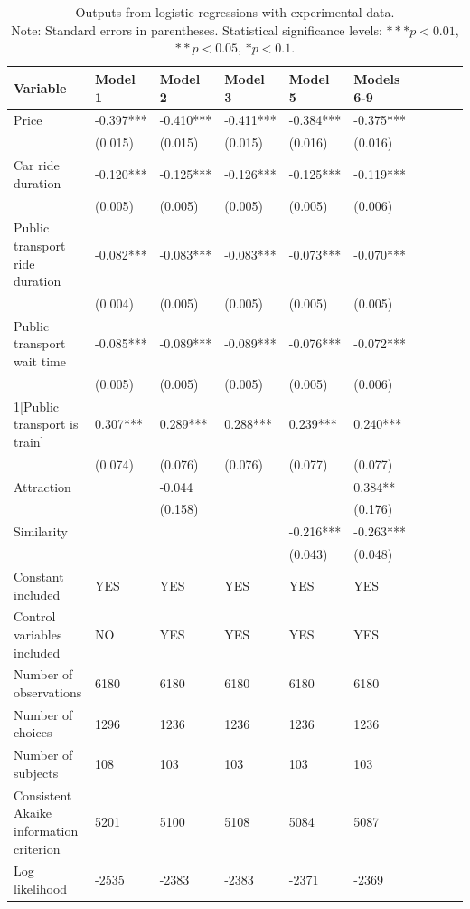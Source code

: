 \documentclass[a4paper,12pt]{article}
\begin{document}
\section{}\label{appendix:nejcDataRobustnessChecks}
\clearpage
\begin{table}
    \centering
    \scriptsize
    \begin{tabular}{p{5.3cm}*{9}{p{1.5cm}}}
    \toprule
    Variable & Model 1 & Model 2 & Model 3 & Model 5 & Models 6-9 \\
    \midrule
    Price & -0.397*** & -0.410*** & -0.411*** & -0.384*** & -0.375*** \\
     & (0.015) & (0.015) & (0.015) & (0.016) & (0.016) \\
    Car ride duration & -0.120*** & -0.125*** & -0.126*** & -0.125*** & -0.119*** \\
     & (0.005) & (0.005) & (0.005) & (0.005) & (0.006) \\
    Public transport ride duration & -0.082*** & -0.083*** & -0.083*** & -0.073*** & -0.070*** \\
     & (0.004) & (0.005) & (0.005) & (0.005) & (0.005) \\
    Public transport wait time & -0.085*** & -0.089*** & -0.089*** & -0.076*** & -0.072*** \\
     & (0.005) & (0.005) & (0.005) & (0.005) & (0.006) \\
    1[Public transport is train] & 0.307*** & 0.289*** & 0.288*** & 0.239*** & 0.240*** \\
     & (0.074) & (0.076) & (0.076) & (0.077) & (0.077) \\
    Attraction & & -0.044 & & & 0.384** \\
     & & (0.158) & & & (0.176) \\
    Similarity & & & & -0.216*** & -0.263*** \\
     & & & & (0.043) & (0.048) \\
    Constant included & YES & YES & YES & YES & YES \\
    Control variables included & NO & YES & YES & YES & YES \\
    Number of observations & 6180 & 6180 & 6180 & 6180 & 6180 \\
    Number of choices & 1296 & 1236 & 1236 & 1236 & 1236 \\
    Number of subjects & 108 & 103 & 103 & 103 & 103 \\
    Consistent Akaike information criterion & 5201 & 5100 & 5108 & 5084 & 5087 \\
    Log likelihood & -2535 & -2383 & -2383 & -2371 & -2369 \\
    \bottomrule
    \end{tabular}
    \caption[Logistic regression results for experimental data]{Outputs from logistic regressions with experimental data.\\ Note: Standard errors in parentheses. Statistical significance levels: $*** p<0.01$, $** p<0.05$, $* p<0.1$.}
    \label{tab:logitExperimentalData}
\end{table}
\end{document}
